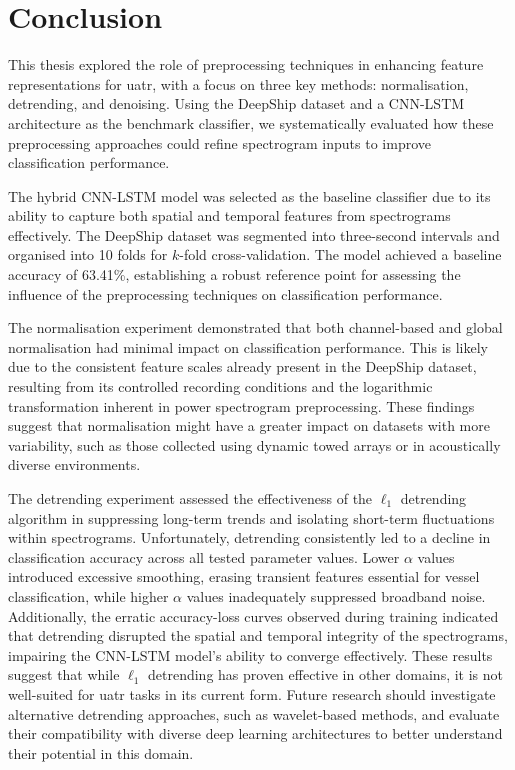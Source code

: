 \chapter{Conclusion}

This thesis explored the role of preprocessing techniques in enhancing feature representations for \acrshort{uatr}, with a focus on three key methods: normalisation, detrending, and denoising. Using the DeepShip dataset and a CNN-LSTM architecture as the benchmark classifier, we systematically evaluated how these preprocessing approaches could refine spectrogram inputs to improve classification performance.

The hybrid CNN-LSTM model was selected as the baseline classifier due to its ability to capture both spatial and temporal features from spectrograms effectively. The DeepShip dataset was segmented into three-second intervals and organised into 10 folds for $k$-fold cross-validation. The model achieved a baseline accuracy of 63.41\%, establishing a robust reference point for assessing the influence of the preprocessing techniques on classification performance.

The normalisation experiment demonstrated that both channel-based and global normalisation had minimal impact on classification performance. This is likely due to the consistent feature scales already present in the DeepShip dataset, resulting from its controlled recording conditions and the logarithmic transformation inherent in power spectrogram preprocessing. These findings suggest that normalisation might have a greater impact on datasets with more variability, such as those collected using dynamic towed arrays or in acoustically diverse environments.

The detrending experiment assessed the effectiveness of the $\ell_1$ detrending algorithm in suppressing long-term trends and isolating short-term fluctuations within spectrograms. Unfortunately, detrending consistently led to a decline in classification accuracy across all tested parameter values. Lower $\alpha$ values introduced excessive smoothing, erasing transient features essential for vessel classification, while higher $\alpha$ values inadequately suppressed broadband noise. Additionally, the erratic accuracy-loss curves observed during training indicated that detrending disrupted the spatial and temporal integrity of the spectrograms, impairing the CNN-LSTM model’s ability to converge effectively. These results suggest that while $\ell_1$ detrending has proven effective in other domains, it is not well-suited for \acrshort{uatr} tasks in its current form. Future research should investigate alternative detrending approaches, such as wavelet-based methods, and evaluate their compatibility with diverse deep learning architectures to better understand their potential in this domain.

